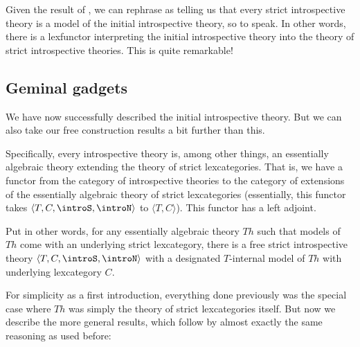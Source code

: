 Given the result of , we can rephrase  as telling us that every strict introspective theory is a model of the initial introspective theory, so to speak. In other words, there is a lexfunctor interpreting the initial introspective theory into the theory of strict introspective theories. This is quite remarkable!

\subsection{Geminal gadgets}
We have now successfully described the initial introspective theory. But we can also take our free construction results a bit further than this.

Specifically, every introspective theory is, among other things, an essentially algebraic theory extending the theory of strict lexcategories. That is, we have a functor from the category of introspective theories to the category of extensions of the essentially algebraic theory of strict lexcategories (essentially, this functor takes $\langle T, C, \introS, \introN \rangle$ to $\langle T, C \rangle$). This functor has a left adjoint.

Put in other words, for any essentially algebraic theory $Th$ such that models of $Th$ come with an underlying strict lexcategory, there is a free strict introspective theory $\langle T, C, \introS, \introN \rangle$ with a designated $T$-internal model of $Th$ with underlying lexcategory $C$.

For simplicity as a first introduction, everything done previously was the special case where $Th$ was simply the theory of strict lexcategories itself. But now we describe the more general results, which follow by almost exactly the same reasoning as used before:



